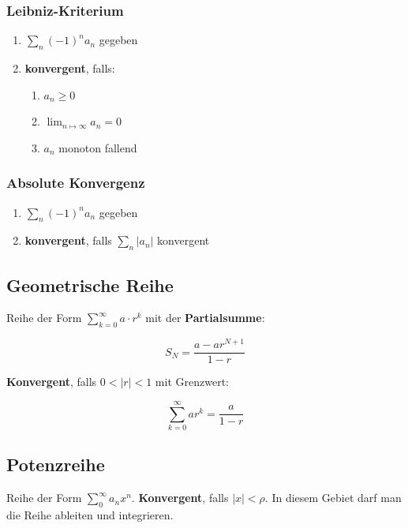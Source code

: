 \documentclass[11pt]{article}
\begin{document}
\subsubsection*{Leibniz-Kriterium}

\begin{enumerate}
	\item $\sum_n (-1)^n a_n$ gegeben
	\item \textbf{konvergent}, falls:
	\begin{enumerate}
		\item $a_n \geq 0$
		\item $\lim_{n\mapsto\infty} a_n = 0$
		\item $a_n$ monoton fallend
	\end{enumerate}
\end{enumerate}

\subsubsection*{Absolute Konvergenz}

\begin{enumerate}
	\item $\sum_n (-1)^n a_n$ gegeben
	\item \textbf{konvergent}, falls $\sum_n |a_n|$ konvergent
\end{enumerate}

\subsection{Geometrische Reihe}

Reihe der Form $\sum^\infty_{k = 0} a \cdot r^k$ mit der \textbf{Partialsumme}:

\begin{equation*}
	S_N=\frac{a-ar^{N+1}}{1-r}
\end{equation*}

\textbf{Konvergent}, falls $0<|r|<1$ mit Grenzwert:

\begin{equation*}
	\sum^\infty_{k=0}ar^k=\frac{a}{1-r}
\end{equation*}

\subsection{Potenzreihe}

Reihe der Form $\sum^\infty_0 a_nx^n$. \textbf{Konvergent}, falls $|x|<\rho$. In diesem Gebiet darf man die Reihe ableiten und integrieren.
\end{document}
